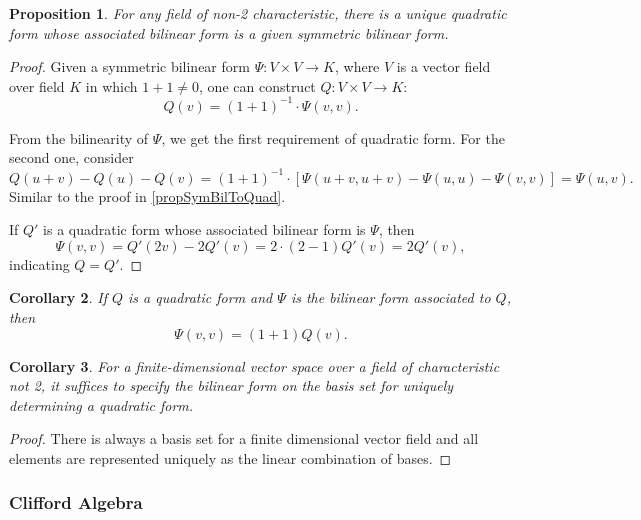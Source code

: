 \documentclass[12pt, letterpaper]{article}
\newtheorem{prop}{Proposition}[section]
\newtheorem{cor}[prop]{Corollary}
\theoremstyle{definition}
\theoremstyle{remark}
\theoremstyle{definition}
\theoremstyle{plain}
\numberwithin{equation}{section}
\begin{document}
	\begin{prop}
		For any field of non-2 characteristic,
		there is a unique quadratic form whose associated bilinear form is a given symmetric bilinear form.
	\end{prop}
	\begin{proof}
		Given a symmetric bilinear form $\Psi\colon V\times V\to K$,
		where $V$ is a vector field over field $K$ in which $1+1\ne0$,
		one can construct $Q\colon V\times V\to K$:
		\[
		Q(v)=(1+1)^{-1}\cdot \Psi(v,v).
		\]
		
		From the bilinearity of $\Psi$, we get the first requirement of quadratic form.
		For the second one, consider
		\[
		Q(u+v)-Q(u)-Q(v)=(1+1)^{-1}\cdot [\Psi(u+v,u+v)-\Psi(u,u)-\Psi(v,v)]=\Psi(u,v).
		\]
		Similar to the proof in \autoref{propSymBilToQuad}.
		
		If $Q'$ is a quadratic form whose associated bilinear form is $\Psi$,
		then
		\[\Psi(v,v)=Q'(2v)-2Q'(v)=2\cdot(2-1)Q'(v)=2Q'(v),\]
		indicating $Q=Q'$.
	\end{proof}
	\begin{cor}
		If $Q$ is a quadratic form and $\Psi$ is the bilinear form associated to $Q$,
		then
		\[\Psi(v,v)=(1+1)Q(v).\]
	\end{cor}
	\begin{cor}
		For a finite-dimensional vector space over a field of characteristic not 2,
		it suffices to specify the bilinear form on the basis set for uniquely determining
		a quadratic form.
	\end{cor}
	\begin{proof}
		There is always a basis set for a finite dimensional vector field and all elements are
		represented uniquely as the linear combination of bases.
	\end{proof}

	\subsubsection{Clifford Algebra}
\end{document}
